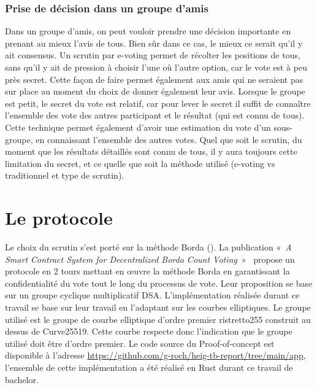 \documentclass[../report]{subfiles}
\begin{document}
\subsection{Prise de décision dans un groupe d'amis}

Dans un groupe d'amis, on peut vouloir prendre une décision importante en prenant au mieux l'avis de tous. 
Bien sûr dans ce cas, le mieux ce serait qu'il y ait consensus.
Un scrutin par e-voting permet de récolter les positions de tous, sans qu'il y ait de pression à choisir l'une où 
l'autre option, car le vote est à peu près secret. 
Cette façon de faire permet également aux amis qui ne seraient pas sur place au moment du choix de donner également leur avis.
Lorsque le groupe est petit, le secret du vote est relatif, car pour lever le secret il suffit de connaître l'ensemble des
vote des autres participant et le résultat (qui est connu de tous).
Cette technique permet également d'avoir une estimation du vote d'un sous-groupe, en connaissant l'ensemble des autres votes.
Quel que soit le scrutin, du moment que les résultats détaillés sont connu de tous, il y aura toujours cette limitation du secret, et ce  
quelle que soit la méthode utilisé (e-voting vs traditionnel et type de scrutin).

%



\chapter{Le protocole}

Le choix du scrutin s'est porté sur la méthode Borda ().
La publication «~\emph{A Smart Contract System for Decentralized Borda Count Voting}~»~\cite{panja_smart_2020}
propose un protocole en 2 tours mettant en œuvre la méthode Borda en garantissant la
confidentialité du vote tout le long du processus de vote.
Leur proposition se base sur un groupe cyclique multiplicatif DSA. 
L'implémentation réalisée durant ce travail se base sur leur travail en l'adaptant sur les courbes elliptiques.
Le groupe utilisé est le groupe de courbe elliptique d'ordre premier ristretto255 construit au dessus de Curve25519.
Cette courbe respecte donc l'indication que le groupe utilisé doit être d'ordre premier.
Le code source du Proof-of-concept est disponible à l'adresse \url{https://github.com/g-roch/heig-tb-report/tree/main/app},
l'ensemble de cette implémentation a été réalisé en Rust durant ce travail de bachelor.
\end{document}
